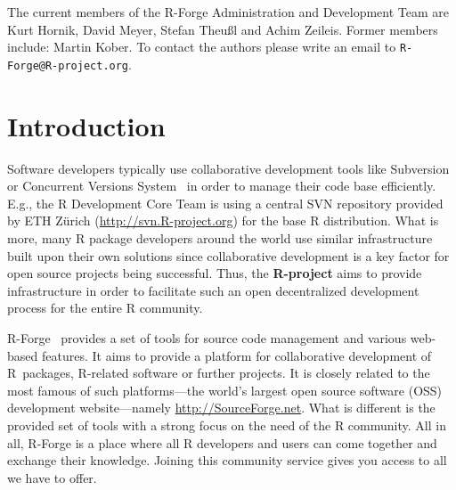 \documentclass[a4paper]{article}
\newcommand{\RFORGE}{\proglang{R}-Forge Administration and Development Team}
\let\email=\texttt
\newcommand{\proglang}[1]{\textsf{#1}}
\begin{document}
\vspace{0.5cm}
The current members of the \RFORGE{} are Kurt Hornik, David Meyer,
Stefan Theu\ss{}l and Achim Zeileis. Former members include: Martin
Kober. To contact the 
authors please write an email to \email{R-Forge@R-project.org}.

\newpage

\pagestyle{plain}
\tableofcontents

\clearpage
\pagestyle{headings}
\setcounter{page}{1}

\section{Introduction}
\label{sec:intro}

Software developers typically use collaborative development tools like
Subversion~\citep[SVN,
see][]{forge:Pilato+Collins-Sussman+Fitzpatrick:2004} or Concurrent
Versions System~\citep[CVS, see][]{forge:Cederqvist:2006} in order to
manage their code base efficiently. E.g., the \proglang{R} Development
Core Team is using a central SVN repository provided by ETH Z\"urich
(\url{http://svn.R-project.org}) for the base \proglang{R}
distribution. What is more, many \proglang{R} package developers
around the world use similar infrastructure built upon their own
solutions since collaborative development is a key factor for open
source projects being successful. Thus, the \textbf{R-project} aims to
provide infrastructure in order to facilitate such an open
decentralized development process for the entire \proglang{R}
community.

\proglang{R}-Forge~\citep[][]{RJournal:Theussl+Zeileis:2009} provides
a set of tools for source code management and various web-based
features. It aims to provide a platform for collaborative development
of \proglang{R}~packages, \proglang{R}-related software or further
projects. It is closely related to the most famous of such
platforms---the world's largest open source software (OSS) development
website---namely \url{http://SourceForge.net}. What is different is
the provided set of tools with a strong focus on the need of the
\proglang{R} community. All in all, \proglang{R}-Forge is a place
where all \proglang{R} developers and users can come together and
exchange their knowledge. Joining this community service gives you
access to all we have to offer.
\end{document}

